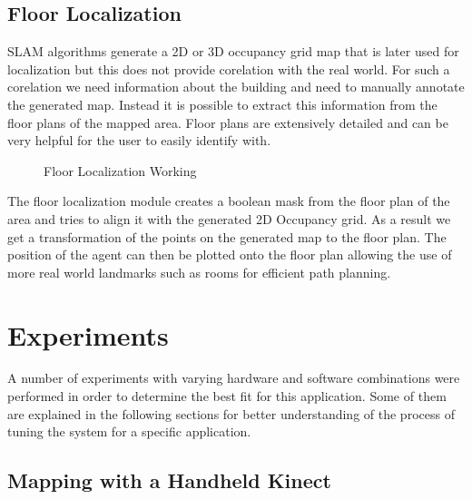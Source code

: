 \documentclass[conference, letterpaper]{IEEEtran}
\begin{document}
\subsection{Floor Localization}

SLAM algorithms generate a 2D or 3D occupancy grid map that is later used for 
localization but this does not provide corelation with the real world. For such 
a corelation we need information about the building and need to manually 
annotate the generated map. Instead it is possible to extract this information
from the floor plans of the mapped area. Floor plans are extensively detailed 
and can be very helpful for the user to easily identify with.

\begin{figure}[ht]
  \centering
  \hfill
  \hfill
  \hfill
  \hfill
  \caption{Floor Localization Working}  
\end{figure}

The floor localization module creates a boolean mask from the floor plan of the 
area and tries to align it with the generated 2D Occupancy grid. As a result we 
get a transformation of the points on the generated map to the floor plan. The 
position of the agent can then be plotted onto the floor plan allowing the use 
of more real world landmarks such as rooms for efficient path planning.

\section{Experiments}

A number of experiments with varying hardware and software combinations were 
performed in order to determine the best fit for this application. Some of them 
are explained in the following sections for better understanding of the process 
of tuning the system for a specific application.

\subsection{Mapping with a Handheld Kinect}
\end{document}
